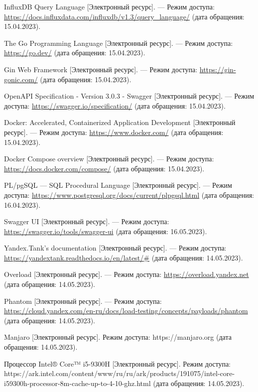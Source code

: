 \begin{thebibliography}{}
	 InfluxDB Query Language [Электронный ресурс]. — Режим доступа: \url{https://docs.influxdata.com/influxdb/v1.3/query_language/} (дата обращения: 15.04.2023).
	 
	 The Go Programming Language [Электронный ресурс]. — Режим доступа: \url{https://go.dev/} (дата обращения: 15.04.2023).
	 
	 Gin Web Framework [Электронный ресурс]. — Режим доступа: \url{https://gin-gonic.com/} (дата обращения: 15.04.2023).
	 
	 OpenAPI Specification - Version 3.0.3 - Swagger [Электронный ресурс]. — Режим доступа: \url{https://swagger.io/specification/} (дата обращения: 15.04.2023).
	 
	 Docker: Accelerated, Containerized Application Development [Электронный ресурс]. — Режим доступа: \url{https://www.docker.com/} (дата обращения: 15.04.2023).
	 
	 Docker Compose overview [Электронный ресурс]. — Режим доступа: \url{https://docs.docker.com/compose/} (дата обращения: 15.04.2023).
	 
	 PL/pgSQL — SQL Procedural Language [Электронный ресурс]. — Режим доступа: \url{https://www.postgresql.org/docs/current/plpgsql.html} (дата обращения: 16.04.2023).
	 
	 Swagger UI [Электронный ресурс]. — Режим доступа: \url{https://swagger.io/tools/swagger-ui} (дата обращения: 16.05.2023).
	 
	 Yandex.Tank’s documentation [Электронный ресурс]. — Режим доступа: \url{https://yandextank.readthedocs.io/en/latest/#} (дата обращения: 14.05.2023).
	 
	 Overload [Электронный ресурс]. — Режим доступа: \url{https://overload.yandex.net} (дата обращения: 14.05.2023).
	 
	 Phantom [Электронный ресурс]. — Режим доступа: \url{https://cloud.yandex.com/en-ru/docs/load-testing/concepts/payloads/phantom} (дата обращения: 14.05.2023).
	 
	 Manjaro [Электронный ресурс]. Режим доступа: https://manjaro.org (дата обращения: 14.05.2023).
	 
	 Процессор Intel® Core™ i5-9300H [Электронный ресурс]. Режим доступа: https://ark.intel.com/content/www/ru/ru/ark/products/191075/intel-core-i59300h-processor-8m-cache-up-to-4-10-ghz.html (дата обращения: 14.05.2023).
\end{thebibliography}
\endgroup

\pagebreak